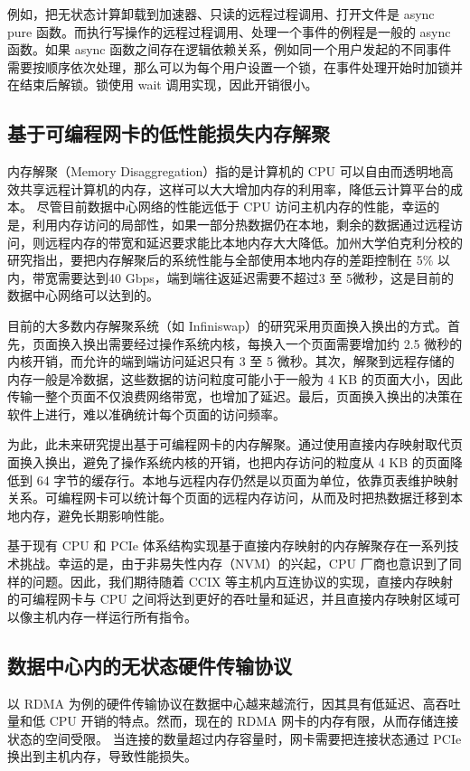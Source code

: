 例如，把无状态计算卸载到加速器、只读的远程过程调用、打开文件是 async pure 函数。而执行写操作的远程过程调用、处理一个事件的例程是一般的 async 函数。如果 async 函数之间存在逻辑依赖关系，例如同一个用户发起的不同事件需要按顺序依次处理，那么可以为每个用户设置一个锁，在事件处理开始时加锁并在结束后解锁。锁使用 wait 调用实现，因此开销很小。

\subsection{基于可编程网卡的低性能损失内存解聚}

内存解聚（Memory Disaggregation）指的是计算机的 CPU 可以自由而透明地高效共享远程计算机的内存，这样可以大大增加内存的利用率，降低云计算平台的成本。
尽管目前数据中心网络的性能远低于 CPU 访问主机内存的性能，幸运的是，利用内存访问的局部性，如果一部分热数据仍在本地，剩余的数据通过远程访问，则远程内存的带宽和延迟要求能比本地内存大大降低。加州大学伯克利分校的研究指出，要把内存解聚后的系统性能与全部使用本地内存的差距控制在 5\% 以内，带宽需要达到40 Gbps，端到端往返延迟需要不超过3 至 5微秒，这是目前的数据中心网络可以达到的。

目前的大多数内存解聚系统（如 Infiniswap）的研究采用页面换入换出的方式。首先，页面换入换出需要经过操作系统内核，每换入一个页面需要增加约 2.5 微秒的内核开销，而允许的端到端访问延迟只有 3 至 5 微秒。其次，解聚到远程存储的内存一般是冷数据，这些数据的访问粒度可能小于一般为 4 KB 的页面大小，因此传输一整个页面不仅浪费网络带宽，也增加了延迟。最后，页面换入换出的决策在软件上进行，难以准确统计每个页面的访问频率。

为此，此未来研究提出基于可编程网卡的内存解聚。通过使用直接内存映射取代页面换入换出，避免了操作系统内核的开销，也把内存访问的粒度从 4 KB 的页面降低到 64 字节的缓存行。本地与远程内存仍然是以页面为单位，依靠页表维护映射关系。可编程网卡可以统计每个页面的远程内存访问，从而及时把热数据迁移到本地内存，避免长期影响性能。

基于现有 CPU 和 PCIe 体系结构实现基于直接内存映射的内存解聚存在一系列技术挑战。幸运的是，由于非易失性内存（NVM）的兴起，CPU 厂商也意识到了同样的问题。因此，我们期待随着 CCIX 等主机内互连协议的实现，直接内存映射的可编程网卡与 CPU 之间将达到更好的吞吐量和延迟，并且直接内存映射区域可以像主机内存一样运行所有指令。


\subsection{数据中心内的无状态硬件传输协议}

以 RDMA 为例的硬件传输协议在数据中心越来越流行，因其具有低延迟、高吞吐量和低 CPU 开销的特点。然而，现在的 RDMA 网卡的内存有限，从而存储连接状态的空间受限。
当连接的数量超过内存容量时，网卡需要把连接状态通过 PCIe 换出到主机内存，导致性能损失。

